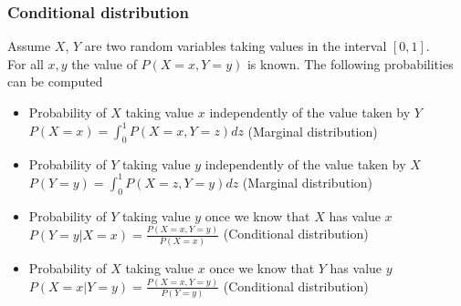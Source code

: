 \begin{frame}
	\frametitle{Conditional distribution}
	Assume $X$, $Y$ are two random variables taking values in the interval $[0,1]$.\\ 
	For all $x,y$ the value of $P(X=x,Y=y)$ is known. The following probabilities can be computed
 	\begin{itemize}
 		\item <2-> Probability of $X$ taking value $x$ independently of the value taken by $Y$ $P(X=x)=\int_0^1 P(X=x, Y=z) dz$ (Marginal distribution)
 		\item <2->Probability of $Y$ taking value $y$ independently of the value taken by $X$ $P(Y=y)=\int_0^1 P(X=z, Y=y) dz$ (Marginal distribution)
 		\item <3->Probability of $Y$ taking value $y$ once we know that $X$ has value $x$ $P(Y=y|X=x)=\frac{P(X=x, Y=y)}{P(X=x)}$ (Conditional distribution)
 		\item <3->Probability of $X$ taking value $x$ once we know that $Y$ has value $y$ $P(X=x|Y=y)=\frac{P(X=x, Y=y)}{P(Y=y)}$ (Conditional distribution)
 	\end{itemize}
 	
\end{frame}

